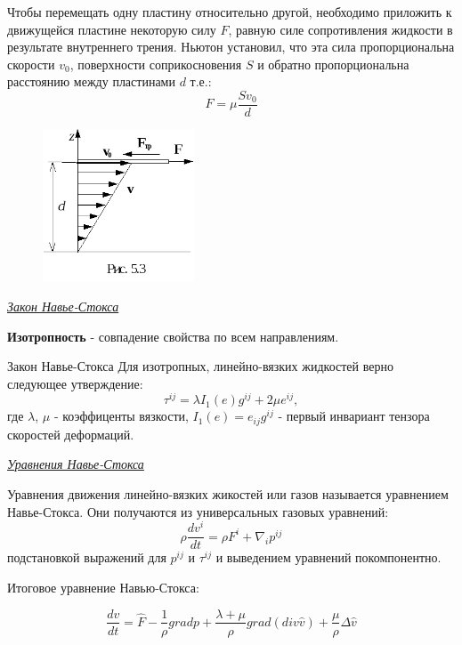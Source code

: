 Чтобы перемещать одну пластину относительно другой, необходимо приложить к движущейся пластине некоторую силу $F$, равную силе сопротивления жидкости в результате внутреннего трения. Ньютон установил, что эта сила пропорциональна скорости $v_0$, поверхности соприкосновения $S$ и обратно пропорциональна расстоянию между пластинами $d$ т.е.:
$$F = \mu\frac{S v_0}{d}$$

\begin{figure}[H]
	\includegraphics[width=0.4\textwidth]{16/newton_experiment.png}
\end{figure}


\begin{center}
	\textit{\underline{Закон Навье-Стокса}}
\end{center}


\begin{defn}
	\textbf{Изотропность} - совпадение свойства по всем направлениям. 
\end{defn}

\begin{theorem}[Э-132]Закон Навье-Стокса
	Для изотропных, линейно-вязких жидкостей верно следующее утверждение:
	$$\tau^{ij} = \lambda I_1(e)g^{ij}+2\mu e^{ij},$$ где $\lambda$, $\mu$ - коэффиценты вязкости, $I_1(e) = e_{ij}g^{ij}$ - первый инвариант тензора скоростей деформаций.
\end{theorem}


\begin{center}
	\textit{\underline{Уравнения Навье-Стокса}}
\end{center}

Уравнения движения линейно-вязких жикостей или газов называется уравнением Навье-Стокса. Они получаются из универсальных газовых уравнений: $$\rho\frac{dv^i}{dt} = \rho F^i + \nabla_{i}p^{ij}$$ подстановкой выражений для $p^{ij}$ и $\tau^{ij}$ и выведением уравнений покомпонентно.

Итоговое уравнение Навью-Стокса:

$$\frac{dv}{dt} = \hat{F} - \frac{1}{\rho}grad p + \frac{\lambda + \mu}{\rho}grad(div \hat{v}) + \frac{\mu}{\rho}\Delta \hat{v}$$


